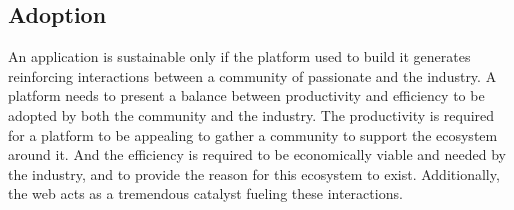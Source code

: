 










\subsection{Adoption} \label{chapter3:definitions:adoption}

An application is sustainable only if the platform used to build it generates reinforcing interactions between a community of passionate and the industry.
A platform needs to present a balance between productivity and efficiency to be adopted by both the community and the industry.
The productivity is required for a platform to be appealing to gather a community to support the ecosystem around it.
And the efficiency is required to be economically viable and needed by the industry, and to provide the reason for this ecosystem to exist.
Additionally, the web acts as a tremendous catalyst fueling these interactions.

